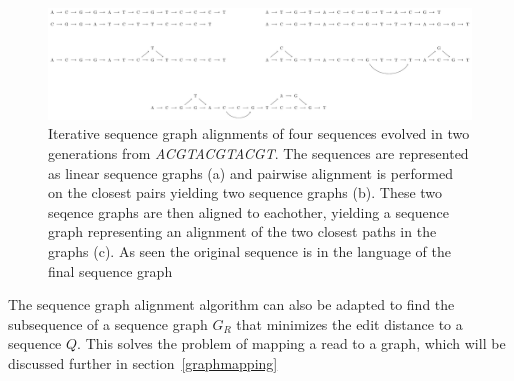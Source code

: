 \begin{figure}
  \includegraphics[width=\textwidth,height=\textheight,keepaspectratio]{figures/graph_msa}
  \caption{Iterative sequence graph alignments of four sequences evolved in two generations from \emph{ACGTACGTACGT}.
    The sequences are represented as linear sequence graphs (a) and pairwise alignment is performed on the closest pairs yielding two sequence graphs (b). These two seqence graphs are then aligned to eachother, yielding a sequence graph representing an alignment of the two closest paths in the graphs (c). As seen the original sequence is in the language of the final sequence graph}
  \label{fig:treealign}
\end{figure}

The sequence graph alignment algorithm can also be adapted to find the subsequence of a sequence graph $G_R$ that minimizes the edit distance to a sequence $Q$. This solves the problem of mapping a read to a graph, which will be discussed further in section~\ref{graphmapping}
% 
